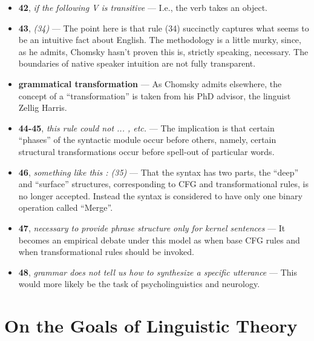 \documentclass[12pt]{article}
\begin{document}
\begin{itemize}
\item \textbf{42}, \textit{if the following V is transitive} --- I.e., the verb takes an object.

\item \textbf{43}, \textit{(34)} --- The point here is that rule (34) succinctly captures what seems to be an intuitive fact about English. The methodology is a little murky, since, as he admits, Chomsky hasn't proven this is, strictly speaking, necessary. The boundaries of native speaker intuition are not fully transparent.

\item \textbf{grammatical transformation} --- As Chomsky admits elsewhere, the concept of a ``transformation'' is taken from his PhD advisor, the linguist Zellig Harris.

\item \textbf{44-45}, \textit{this rule could not ... , etc.} --- The implication is that certain ``phases'' of the syntactic module occur before others, namely, certain structural transformations occur before spell-out of particular words.

\item \textbf{46}, \textit{something like this : (35)} --- That the syntax has two parts, the ``deep'' and ``surface'' structures, corresponding to CFG and transformational rules, is no longer accepted. Instead the syntax is considered to have only one binary operation called ``Merge''.

\item \textbf{47}, \textit{necessary to provide phrase structure only for kernel sentences} --- It becomes an empirical debate under this model as when base CFG rules and when transformational rules should be invoked.

\item \textbf{48}, \textit{grammar does not tell us how to synthesize a specific utterance} --- This would more likely be the task of psycholinguistics and neurology.

\end{itemize}

\section{On the Goals of Linguistic Theory}
\end{document}
